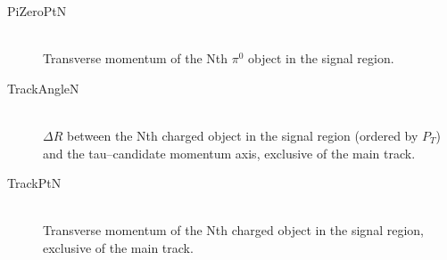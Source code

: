 \begin{description}
  \item[PiZeroPtN] \hfill \\
  Transverse momentum of the Nth $\pi^0$ object in the signal region.

  \item[TrackAngleN] \hfill \\
  $\Delta R$ between the Nth charged object in the signal region (ordered by $P_T$) and
    the tau--candidate momentum axis, exclusive of the main track.

  \item[TrackPtN] \hfill \\
  Transverse momentum of the Nth charged object in the signal region, exclusive of the 
    main track.

\end{description}
    
